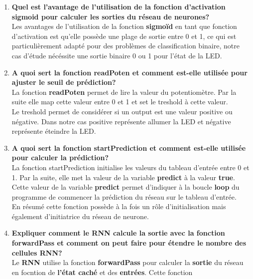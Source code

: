 \documentclass[a4paper, 12pt, openany]{book}
\begin{document}
\begin{enumerate}
  \item {
    \textbf{Quel est l'avantage de l'utilisation de la fonction d'activation sigmoid pour calculer les sorties du réseau de neurones?}\vspace{0.2cm}\\
    Les avantages de l'utilisation de la fonction \textbf{sigmoïd} en tant que fonction d'activation est qu'elle possède une plage de sortie entre 0 et 1, ce 
    qui est particulièrement adapté pour des problèmes de classification binaire, notre cas d'étude nécéssite une sortie binaire 0 ou 1 pour l'état de la LED.\@
  } \\
  \item {
    \textbf{A quoi sert la fonction readPoten et comment est-elle utilisée pour ajuster le seuil de prédiction?} \vspace{0.2cm}\\
    La fonction \textbf{readPoten} permet de lire la valeur du potentiomètre. Par la suite elle map cette valeur entre 0 et 1 et set le treshold à cette valeur.\\
    Le treshold permet de considérer si un output est une valeur positive ou négative. Dans notre cas positive représente allumer la LED et négative représente éteindre la LED.\@
  } \\
  \item {
    \textbf{A quoi sert la fonction startPrediction et comment est-elle utilisée pour calculer la prédiction?} \vspace{0.2cm}\\
    La fonction startPrediction initialise les valeurs du tableau d'entrée entre 0 et 1. Par la suite, elle met la valeur de la variable \textbf{predict} à la valeur \textbf{true}.
    Cette valeur de la variable \textbf{predict} permet d'indiquer à la boucle \textbf{loop} du programme de commencer la prédiction du réseau sur le tableau d'entrée.\\
    En résumé cette fonction possède à la fois un rôle d'initialisation mais également d'initiatrice du réseau de neurone.
  } \\
  \item {
    \textbf{Expliquer comment le RNN calcule la sortie avec la fonction forwardPass et comment on peut faire pour étendre le nombre des cellules RNN?} \vspace{0.2cm}\\
    Le \textbf{RNN} utilise la fonction \textbf{forwardPass} pour calculer la \textbf{sortie} du réseau en focntion de \textbf{l'état caché} et des \textbf{entrées}. Cette fonction 
}
\end{enumerate}
\end{document}
